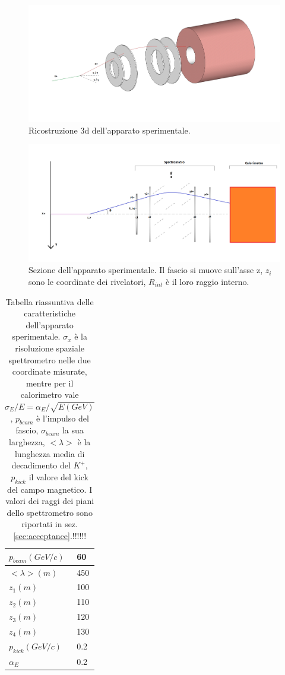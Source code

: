 \documentclass[8pt]{extarticle}
\begin{document}
\begin{figure}
\includegraphics[scale=0.3]{apparato_rare_3d}
\caption{Ricostruzione 3d dell'apparato sperimentale.}
\label{fig:apparato_rare_3d}
\end{figure}

\begin{figure}
\includegraphics[scale=0.3]{apparato_rare_2d}
\caption{Sezione dell'apparato sperimentale. Il fascio si muove sull'asse z, $z_i$ sono le coordinate dei rivelatori, $R_{int}$ è il loro raggio interno.}
\label{fig:apparato_rare_2d}
\end{figure}

\begin{table}[h!]
\centering
\begin{tabular}{|p{2.5 cm}| p{1 cm}|}
\hline\hline
$p_{beam} (GeV/c)$ & 60 \\
\hline
$<\lambda> (m)$ & 450 \\
\hline
$z_1 (m)$ & 100 \\
\hline
$z_2 (m)$ & 110 \\
\hline
$z_3 (m)$ & 120 \\
\hline
$z_4 (m)$ & 130 \\
\hline
$p_{kick} (GeV/c)$ & 0.2 \\
\hline
$\alpha_E$ & 0.2 \\
\hline \hline
\end{tabular}
\caption{Tabella riassuntiva delle caratteristiche dell'apparato sperimentale. $\sigma_x$ è la risoluzione spaziale spettrometro nelle due coordinate misurate, mentre per il calorimetro vale $\sigma_E/E = \alpha_E/\sqrt{E(GeV)}$, $p_{beam}$ è l'impulso del fascio, $\sigma_{beam}$ la sua larghezza, $<\lambda>$ è la lunghezza media di decadimento del $K^+$, $p_{kick}$ il valore del kick del campo magnetico. I valori dei raggi dei piani dello spettrometro sono riportati in sez.\ref{sec:acceptance}.!!!!!!}
\label{tab:apparato}
\end{table}
\end{document}
